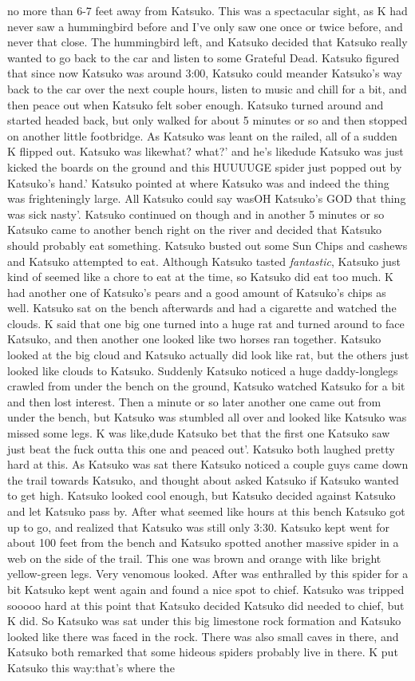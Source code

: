 \documentclass[12pt]{book}
\begin{document}
no more than 6-7 feet away from Katsuko. This was a spectacular sight, as K had never saw a hummingbird before and I've only saw one once or twice before, and never that close. The hummingbird left, and Katsuko decided that Katsuko really wanted to go back to the car and listen to some Grateful Dead. Katsuko figured that since now Katsuko was around 3:00, Katsuko could meander Katsuko's way back to the car over the next couple hours, listen to music and chill for a bit, and then peace out when Katsuko felt sober enough. Katsuko turned around and started headed back, but only walked for about 5 minutes or so and then stopped on another little footbridge. As Katsuko was leant on the railed, all of a sudden K flipped out. Katsuko was likewhat? what?' and he's likedude Katsuko was just kicked the boards on the ground and this HUUUUGE spider just popped out by Katsuko's hand.' Katsuko pointed at where Katsuko was and indeed the thing was frighteningly large. All Katsuko could say wasOH Katsuko's GOD that thing was sick nasty'. Katsuko continued on though and in another 5 minutes or so Katsuko came to another bench right on the river and decided that Katsuko should probably eat something. Katsuko busted out some Sun Chips and cashews and Katsuko attempted to eat. Although Katsuko tasted \emph{fantastic}, Katsuko just kind of seemed like a chore to eat at the time, so Katsuko did eat too much. K had another one of Katsuko's pears and a good amount of Katsuko's chips as well. Katsuko sat on the bench afterwards and had a cigarette and watched the clouds. K said that one big one turned into a huge rat and turned around to face Katsuko, and then another one looked like two horses ran together. Katsuko looked at the big cloud and Katsuko actually did look like rat, but the others just looked like clouds to Katsuko. Suddenly Katsuko noticed a huge daddy-longlegs crawled from under the bench on the ground, Katsuko watched Katsuko for a bit and then lost interest. Then a minute or so later another one came out from under the bench, but Katsuko was stumbled all over and looked like Katsuko was missed some legs. K was like,dude Katsuko bet that the first one Katsuko saw just beat the fuck outta this one and peaced out'. Katsuko both laughed pretty hard at this. As Katsuko was sat there Katsuko noticed a couple guys came down the trail towards Katsuko, and thought about asked Katsuko if Katsuko wanted to get high. Katsuko looked cool enough, but Katsuko decided against Katsuko and let Katsuko pass by. After what seemed like hours at this bench Katsuko got up to go, and realized that Katsuko was still only 3:30. Katsuko kept went for about 100 feet from the bench and Katsuko spotted another massive spider in a web on the side of the trail. This one was brown and orange with like bright yellow-green legs. Very venomous looked. After was enthralled by this spider for a bit Katsuko kept went again and found a nice spot to chief. Katsuko was tripped sooooo hard at this point that Katsuko decided Katsuko did needed to chief, but K did. So Katsuko was sat under this big limestone rock formation and Katsuko looked like there was faced in the rock. There was also small caves in there, and Katsuko both remarked that some hideous spiders probably live in there. K put Katsuko this way:that's where the 
\end{document}
